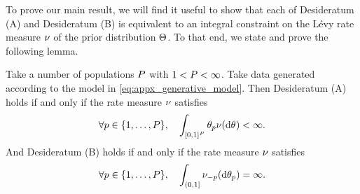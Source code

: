 To prove our main result, we will find it useful to show that each of Desideratum (A) and Desideratum (B) is equivalent to
an integral constraint on the L\'{e}vy  rate measure $\nu$ of the prior distribution $\Theta$. To that end, we state and prove the following lemma.
\begin{myLemma}
	Take a number of populations $P$ with $1 < P < \infty$.
	Take data generated according to the model in \cref{eq:appx_generative_model}. Then Desideratum (A) holds if and only if the rate measure $\nu$ satisfies  
	\begin{equation}
		\forall \popidx \in \{1,\ldots,\numpops\}, \quad \int_{[0,1]^\numpops} \variantfreqperpop{\popidx} \levync(\de\vecvariantfreq{})<\infty.  \label{eq:finite_first_moment}
	\end{equation} 
	And Desideratum (B) holds if and only if the rate measure $\nu$ satisfies 
	\begin{equation}
		\forall p \in \{1,\ldots,P\}, \quad \int_{(0,1]}  \nu_{-p} (\mathrm{d} \theta_{p})=\infty. \label{eq:infinite_mass}
	\end{equation}
    \label{lemma:integral_requirements}
\end{myLemma}
